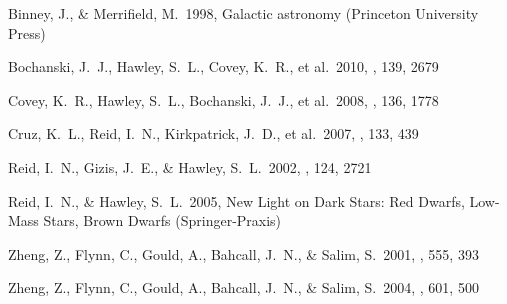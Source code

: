 \documentclass[preprint]{aastex}
\begin{document}
\acknowledgements

\clearpage

\begin{thebibliography}{}

 Binney, J.,
  \& Merrifield, M.\ 1998, Galactic astronomy (Princeton University
  Press)

 Bochanski,
  J.~J., Hawley, S.~L., Covey, K.~R., et al.\ 2010, \aj, 139, 2679


 Covey, K.~R.,
  Hawley, S.~L., Bochanski, J.~J., et al.\ 2008, \aj, 136, 1778

 Cruz, K.~L., Reid,
  I.~N., Kirkpatrick, J.~D., et al.\ 2007, \aj, 133, 439

 Reid, I.~N., Gizis,
  J.~E., \& Hawley, S.~L.\ 2002, \aj, 124, 2721

 Reid, I.~N., \&
  Hawley, S.~L.\ 2005, New Light on Dark Stars: Red Dwarfs, Low-Mass
  Stars, Brown Dwarfs (Springer-Praxis)

 Zheng, Z., Flynn,
  C., Gould, A., Bahcall, J.~N., \& Salim, S.\ 2001, \apj, 555, 393

 Zheng, Z., Flynn,
  C., Gould, A., Bahcall, J.~N., \& Salim, S.\ 2004, \apj, 601, 500

\end{thebibliography}
\end{document}
